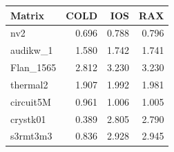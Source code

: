 \begin{table}[htbp]
  \centering
  \label{tab:methodology_x86}
  \begin{tabular}{lrrr}
    \toprule
    \textbf{Matrix} & \textbf{COLD} & \textbf{IOS} & \textbf{RAX} \\
    \midrule
    nv2 & 0.696 & 0.788 & 0.796 \\
    audikw\_1 & 1.580 & 1.742 & 1.741 \\
    Flan\_1565 & 2.812 & 3.230 & 3.230 \\
    thermal2 & 1.907 & 1.992 & 1.981 \\
    circuit5M & 0.961 & 1.006 & 1.005 \\
    crystk01 & 0.389 & 2.805 & 2.790 \\
    s3rmt3m3 & 0.836 & 2.928 & 2.945 \\
    \bottomrule
  \end{tabular}
\end{table}